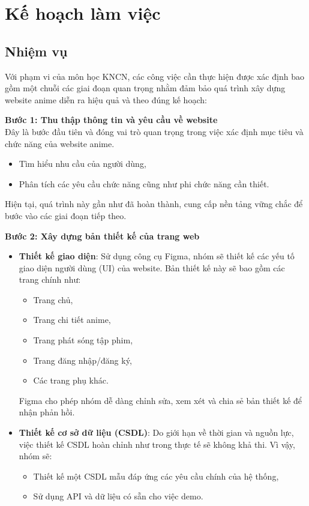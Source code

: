 \section{Kế hoạch làm việc}

\subsection{Nhiệm vụ}

Với phạm vi của môn học KNCN, các công việc cần thực hiện được xác định bao gồm một chuỗi các giai đoạn quan trọng nhằm đảm bảo quá trình xây dựng website anime diễn ra hiệu quả và theo đúng kế hoạch:

\textbf{Bước 1: Thu thập thông tin và yêu cầu về website} \\
Đây là bước đầu tiên và đóng vai trò quan trọng trong việc xác định mục tiêu và chức năng của website anime.
\begin{itemize}
    \item Tìm hiểu nhu cầu của người dùng,
    \item Phân tích các yêu cầu chức năng cũng như phi chức năng cần thiết.
\end{itemize}
Hiện tại, quá trình này gần như đã hoàn thành, cung cấp nền tảng vững chắc để bước vào các giai đoạn tiếp theo.

\textbf{Bước 2: Xây dựng bản thiết kế của trang web}
\begin{itemize}
    \item \textbf{Thiết kế giao diện}: Sử dụng công cụ Figma, nhóm sẽ thiết kế các yếu tố giao diện người dùng (UI) của website. Bản thiết kế này sẽ bao gồm các trang chính như:
    \begin{itemize}
        \item Trang chủ,
        \item Trang chi tiết anime,
        \item Trang phát sóng tập phim,
        \item Trang đăng nhập/đăng ký, 
        \item Các trang phụ khác.
    \end{itemize}
    Figma cho phép nhóm dễ dàng chỉnh sửa, xem xét và chia sẻ bản thiết kế để nhận phản hồi.
    
    \item \textbf{Thiết kế cơ sở dữ liệu (CSDL)}: Do giới hạn về thời gian và nguồn lực, việc thiết kế CSDL hoàn chỉnh như trong thực tế sẽ không khả thi. Vì vậy, nhóm sẽ:
    \begin{itemize}
        \item Thiết kế một CSDL mẫu đáp ứng các yêu cầu chính của hệ thống,
        \item Sử dụng API và dữ liệu có sẵn cho việc demo.
    \end{itemize}
\end{itemize}

